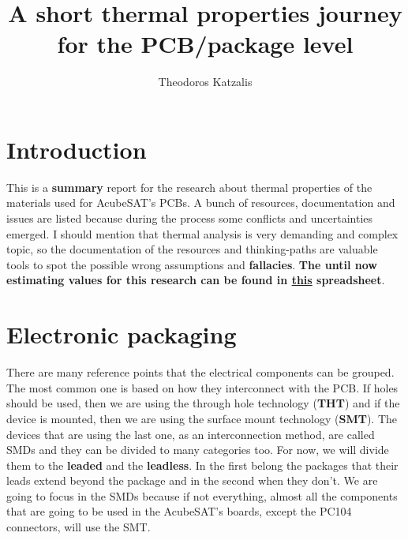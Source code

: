 \documentclass[final]{cubedoc}
\title{A short thermal properties journey for the PCB/package level} %
\author{Theodoros Katzalis}
\begin{document}
	
	\section{Introduction}
	
	This is a \textbf{summary} report for the research about thermal properties of the materials used for AcubeSAT's PCBs. A bunch of resources, documentation and issues are listed because during the process some conflicts and uncertainties emerged. I should mention that thermal analysis is very demanding and complex topic, so the documentation of the resources and thinking-paths are valuable tools to spot the possible wrong assumptions and \textbf{fallacies}. \textbf{The until now estimating values for this research can be found in \href{https://drive.google.com/open?id=1gGPhBZe94Yt7D8FDdGNza4ZnG0pRfhT0xG7Z2tBdK7o}{this} spreadsheet}.
	
	
	
	
	
	\section{Electronic packaging}
	
	There are many reference points that the electrical components can be grouped. The most common one is based on how they interconnect with the PCB. If holes should be used, then we are using the through hole technology (\textbf{THT}) and if the device is mounted, then we are using the surface mount technology (\textbf{SMT}). The devices that are using the last one, as an interconnection method, are called SMDs and they can be divided to many categories too. For now, we will divide them to the \textbf{leaded} and the \textbf{leadless}. In the first belong the packages that their leads extend beyond the package and in the second when they don't. We are going to focus in the SMDs because if not everything, almost all the components that are going to be used in the AcubeSAT's boards, except the PC104 connectors, will use the SMT. 
	
\end{document}
